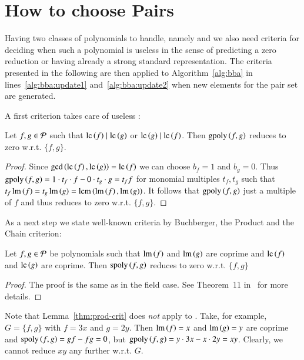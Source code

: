 \section{How to choose Pairs}
\label{sec:pairs}
Having two classes of polynomials to handle, namely \spts and \gpts we also need
criteria for deciding when such a polynomial is useless in the sense of
predicting a zero reduction or having already a strong standard representation.
The criteria presented in the following are then applied to
Algorithm~\ref{alg:bba} in lines~\ref{alg:bba:update1} and~\ref{alg:bba:update2}
when new elements for the pair set are generated.

A first criterion takes care of useless \gpts:

\begin{lemma}
Let $f,g \in \mathcal{P}$ such that $\mathrm{lc}\left({f}\right) \mid \mathrm{lc}\left({g}\right)$ or $\mathrm{lc}\left({g}\right) \mid \mathrm{lc}\left({f}\right)$. Then $\mathrm{gpoly}\left({f},{g}\right)$ reduces
to zero w.r.t. $\{f,g\}$.
\label{crit:gpoly-easy}
\end{lemma}

\begin{proof}
Since $\gcd\left(\mathrm{lc}\left({f}\right), \mathrm{lc}\left({g}\right)\right) = \mathrm{lc}\left({f}\right)$ we can choose $b_f = 1$ and $b_g
=0$. Thus $\mathrm{gpoly}\left({f},{g}\right) = 1 \cdot t_f \cdot f - 0 \cdot t_g \cdot g = t_f f$ for monomial
multiples $t_f, t_g$ such that $t_f \operatorname{lm}\left({f}\right) = t_g \operatorname{lm}\left({g}\right) = \operatorname{lcm}\left(\operatorname{lm}\left({f}\right), \operatorname{lm}\left({g}\right)\right)$. It follows that $\mathrm{gpoly}\left({f},{g}\right)$ just a multiple of $f$ and
thus reduces to zero w.r.t. $\{f,g\}$.
\end{proof}

As a next step we state well-known criteria by Buchberger, the Product and the
Chain criterion:

\begin{lemma}
Let
$f,g \in \mathcal{P}$ be polynomials such that $\operatorname{lm}\left({f}\right)$ and $\operatorname{lm}\left({g}\right)$ are coprime and $\mathrm{lc}\left({f}\right)$ and $\mathrm{lc}\left({g}\right)$ are coprime.
Then $\mathrm{spoly}\left({f},{g}\right)$ reduces to zero w.r.t. $\{f,g\}$
\label{thm:prod-crit}
\end{lemma}

\begin{proof}
The proof is the same as in the field case.
See Theorem~11 in~\cite{lichtblau2012} for more details.
\end{proof}

Note that Lemma~\ref{thm:prod-crit} does \emph{not} apply to \gpts. Take, for
example, $G=\{f,g\}$ with $f=3x$ and $g=2y$. Then $\operatorname{lm}\left({f}\right) = x$ and $\operatorname{lm}\left({g}\right) = y$
are coprime and $\mathrm{spoly}\left({f},{g}\right) = g f - fg = 0$, but $\mathrm{gpoly}\left({f},{g}\right) = y \cdot 3x - x
\cdot 2y = xy$. Clearly, we cannot reduce $xy$ any further w.r.t. $G$.

